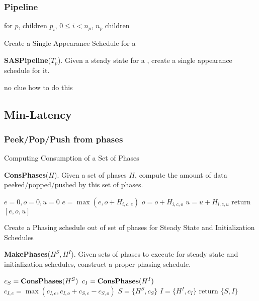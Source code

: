 \subsubsection{Pipeline}

for {\pipeline} $p$, children $p_i$, $0 \le i < n_p$, $n_p$ children

\begin{algorithm}
\label{alg:sas-pipeline} \caption{Create a Single Appearance
Schedule for a {\pipeline}} {\bf SASPipeline}($T_p$). Given a steady
state for a {\pipeline}, create a single appearance schedule for it.
\begin{algorithmic}
\STATE no clue how to do this
\end{algorithmic}
\end{algorithm}

\subsection{Min-Latency}

\subsubsection{Peek/Pop/Push from phases}

\begin{algorithm}
\label{alg:ph-consumption} \caption{Computing Consumption of a Set
of Phases} {\bf ConsPhases}($H$).  Given a set of phases $H$,
compute the amount of data peeked/popped/pushed by this set of
phases.
\begin{algorithmic}
\STATE $e = 0, o = 0, u = 0$
\STATE $e = \max(e, o + H_{i, c, e})$
\STATE $o = o + H_{i, c, o}$
\STATE $u = u + H_{i, c, u}$
\ENDFOR
\STATE return $[e, o, u]$
\end{algorithmic}
\end{algorithm}

\begin{algorithm}
\label{alg:init-peek} \caption{Create a Phasing schedule out of
set of phases for Steady State and Initialization Schedules} {\bf
MakePhases}($H^S, H^I$). Given sets of phases to execute for
steady state and initialization schedules, construct a proper
phasing schedule.
\begin{algorithmic}
\STATE $c_S = {\bf ConsPhases} (H^S)$
\STATE $c_I = {\bf ConsPhases} (H^I)$
\STATE $c_{I,e} = \max(c_{I,e}, c_{I,o} + c_{S,e} - c_{S,o})$
\STATE $S = \{H^S, c_S\}$
\STATE $I = \{H^I, c_I\}$
\STATE return $\{S, I\}$
\end{algorithmic}
\end{algorithm}

